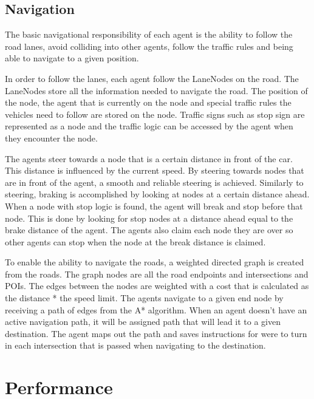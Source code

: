 \subsection{Navigation}
    The basic navigational responsibility of each agent is the ability to follow the road lanes, avoid colliding into other agents, follow the traffic rules and being able to navigate to a given position.

    In order to follow the lanes, each agent follow the LaneNodes on the road. The LaneNodes store all the information needed to navigate the road. The position of the node, the agent that is currently on the node and special traffic rules the vehicles need to follow are stored on the node. Traffic signs such as stop sign are represented as a node and the traffic logic can be accessed by the agent when they encounter the node. 

    The agents steer towards a node that is a certain distance in front of the car. This distance is influenced by the current speed. By steering towards nodes that are in front of the agent, a smooth and reliable steering is achieved. Similarly to steering, braking is accomplished by looking at nodes at a certain distance ahead. When a node with stop logic is found, the agent will break and stop before that node. This is done by looking for stop nodes at a distance ahead equal to the brake distance of the agent. The agents also claim each node they are over so other agents can stop when the node at the break distance is claimed.                                          

    To enable the ability to navigate the roads, a weighted directed graph is created from the roads. The graph nodes are all the road endpoints and intersections and POIs. The edges between the nodes are weighted with a cost that is calculated as the distance * the speed limit. The agents navigate to a given end node by receiving a path of edges from the A* algorithm. When an agent doesn't have an active navigation path, it will be assigned path that will lead it to a given destination. The agent maps out the path and saves instructions for were to turn in each intersection that is passed when navigating to the destination.

\section{Performance}

